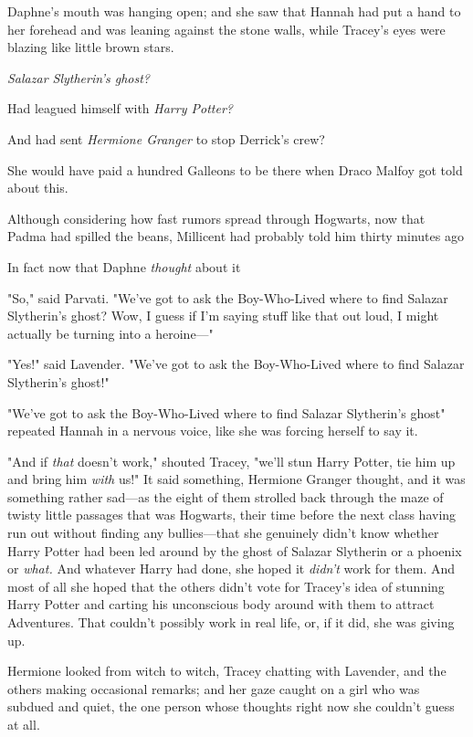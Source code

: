 Daphne's mouth was hanging open; and she saw that Hannah had put a hand to her
forehead and was leaning against the stone walls, while Tracey's eyes were
blazing like little brown stars.

\emph{Salazar Slytherin's ghost?}

Had leagued himself with \emph{Harry Potter?}

And had sent \emph{Hermione Granger} to stop Derrick's crew?

She would have paid a hundred Galleons to be there when Draco Malfoy got told
about this.

Although considering how fast rumors spread through Hogwarts, now that Padma
had spilled the beans, Millicent had probably told him thirty minutes
ago{\el}

In fact{\el} now that Daphne \emph{thought} about it{\el}

"So," said Parvati. "We've got to ask the Boy-Who-Lived where to find Salazar
Slytherin's ghost? Wow, I guess if I'm saying stuff like that out loud, I might
actually be turning into a heroine\mbox{---}"

"Yes!" said Lavender. "We've got to ask the Boy-Who-Lived where to find Salazar
Slytherin's ghost!"

"We've got to ask{\el} the Boy-Who-Lived{\el} where to find Salazar
Slytherin's ghost{\el}" repeated Hannah in a nervous voice, like she was
forcing herself to say it.

"And if \emph{that} doesn't work," shouted Tracey, "we'll stun Harry Potter,
tie him up and bring him \emph{with} us!"
\sbreak
It said something, Hermione Granger thought, and it was something rather
sad---as the eight of them strolled back through the maze of twisty little
passages that was Hogwarts, their time before the next class having run out
without finding any bullies---that she genuinely didn't know whether Harry
Potter had been led around by the ghost of Salazar Slytherin or a phoenix or
\emph{what.} And whatever Harry had done, she hoped it \emph{didn't} work for
them. And most of all she hoped that the others didn't vote for Tracey's idea
of stunning Harry Potter and carting his unconscious body around with them to
attract Adventures. That couldn't possibly work in real life, or, if it did,
she was giving up.

Hermione looked from witch to witch, Tracey chatting with Lavender, and the
others making occasional remarks; and her gaze caught on a girl who was subdued
and quiet, the one person whose thoughts right now she couldn't guess at all.

